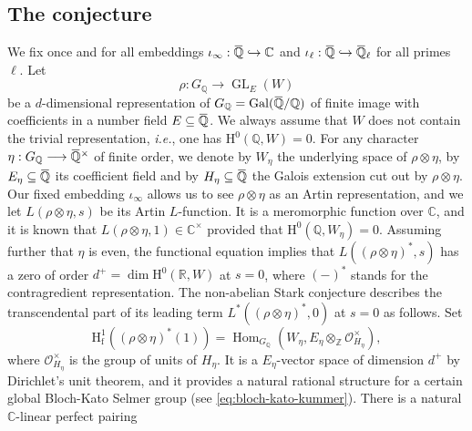 \documentclass[12pt]{amsart}
\newcommand\bR{\mathbb{R}}
\newcommand\bC{\mathbb{C}}
\newcommand\bZ{\mathbb{Z}}
\newcommand\bQ{\mathbb{Q}}
\newcommand\cO{\mathcal{O}}
\newcommand{\ob}[1]{\mkern 1.5mu\overline{\mkern-1.5mu#1\mkern-1.5mu}\mkern 1.5mu}
\DeclareMathOperator{\Gal}{Gal}
\DeclareMathOperator{\Hom}{Hom}
\DeclareMathOperator{\GL}{GL}
\newcommand{\HH}{\mathrm{H}}
\newcommand{\ff}{\mathrm{f}}
\theoremstyle{defstyle}
\theoremstyle{thmstyle}
\begin{document}
\subsection{The conjecture}
We fix once and for all embeddings $\iota_\infty:\ob{\bQ} \hookrightarrow \bC$ and $\iota_\ell : \ob{\bQ} \hookrightarrow \ob{\bQ}_\ell$ for all primes $\ell$.  Let $$\rho : G_{\bQ}\longrightarrow \GL_E(W)$$ be a $d$-dimensional representation of $G_\bQ=\Gal(\ob{\bQ}/\bQ)$ of finite image with coefficients in a number field $E \subseteq \ob{\bQ}$. We always assume that $W$ does not contain the trivial representation, \textit{i.e.}, one has $\HH^0(\bQ,W)=0$. For any character $\eta:G_\bQ \longrightarrow \ob{\bQ}^\times$ of finite order, we denote by $W_\eta$ the underlying space of $\rho\otimes\eta$, by $E_\eta\subseteq \ob{\bQ}$ its coefficient field and by $H_\eta\subseteq \ob{\bQ}$ the Galois extension cut out by $\rho\otimes\eta$. Our fixed embedding $\iota_\infty$ allows us to see $\rho\otimes\eta$ as an Artin representation, and we let $L(\rho\otimes\eta,s)$ be its Artin $L$-function. It is a meromorphic function over $\bC$, and it is known that $L(\rho\otimes\eta,1)\in\bC^\times$ provided that $\HH^0(\bQ,W_\eta)=0$. Assuming further that $\eta$ is even, the functional equation implies that $L((\rho\otimes\eta)^*,s)$ has a zero of order $d^+=\dim\HH^0(\bR,W)$ at $s=0$, where $(-)^*$ stands for the contragredient representation. The non-abelian Stark conjecture \cite{stark2} describes the transcendental part of its leading term $L^*((\rho\otimes\eta)^*,0)$ at $s=0$ as follows. Set 
\[\HH^1_\ff((\rho\otimes\eta)^*(1))=\Hom_{G_{\bQ}}(W_\eta,E_\eta \otimes_{\bZ} \cO_{H_\eta}^\times),\] 
where $\cO_{H_\eta}^\times$ is the group of units of $H_\eta$. It is a $E_\eta$-vector space of dimension $d^+$ by Dirichlet's unit theorem, and it provides a natural rational structure for a certain global Bloch-Kato Selmer group (see \eqref{eq:bloch-kato-kummer}).
There is a natural $\bC$-linear perfect pairing 
\end{document}
